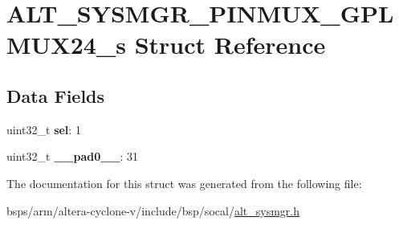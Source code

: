 \hypertarget{structALT__SYSMGR__PINMUX__GPLMUX24__s}{}\section{A\+L\+T\+\_\+\+S\+Y\+S\+M\+G\+R\+\_\+\+P\+I\+N\+M\+U\+X\+\_\+\+G\+P\+L\+M\+U\+X24\+\_\+s Struct Reference}
\label{structALT__SYSMGR__PINMUX__GPLMUX24__s}
\subsection*{Data Fields}
\begin{DoxyCompactItemize}
\item 
\mbox{\label{structALT__SYSMGR__PINMUX__GPLMUX24__s_a61ecf74198328230518e9c69bed95b71}} 
uint32\+\_\+t {\bfseries sel}\+: 1
\item 
\mbox{\label{structALT__SYSMGR__PINMUX__GPLMUX24__s_a00c6f5d9e82e1e64b56b3308cc4343bb}} 
uint32\+\_\+t {\bfseries \+\_\+\+\_\+pad0\+\_\+\+\_\+}\+: 31
\end{DoxyCompactItemize}


The documentation for this struct was generated from the following file\+:\begin{DoxyCompactItemize}
\item 
bsps/arm/altera-\/cyclone-\/v/include/bsp/socal/\mbox{\hyperlink{alt__sysmgr_8h}{alt\+\_\+sysmgr.\+h}}\end{DoxyCompactItemize}
